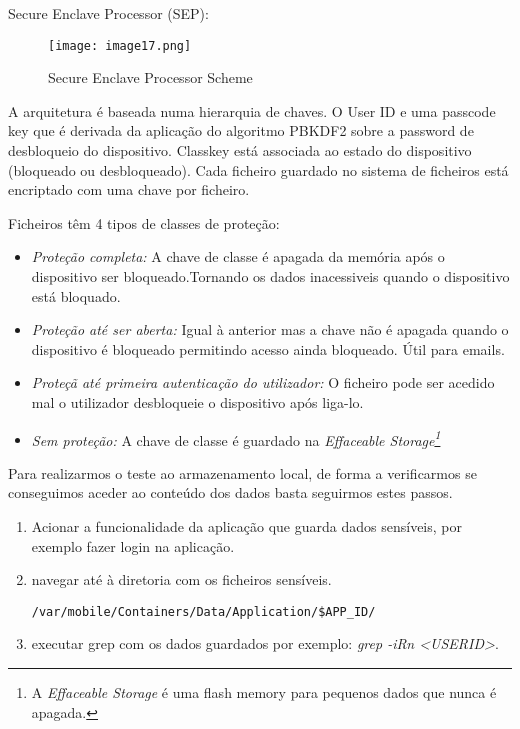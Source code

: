   Secure Enclave Processor (SEP):\par

\begin{figure}[H]
\centering
\texttt{[image: image17.png]}
\caption {Secure Enclave Processor Scheme}
\label {fig01}
\end{figure}

 		A arquitetura é baseada numa hierarquia de chaves.
 		O User ID e uma passcode key que é derivada da aplicação do algoritmo PBKDF2 sobre a password de desbloqueio do dispositivo. 
 		Classkey está associada ao estado do dispositivo (bloqueado ou desbloqueado).
 		Cada ficheiro guardado no sistema de ficheiros está encriptado com uma chave por ficheiro.\par


Ficheiros têm 4 tipos de classes de proteção:

\begin{itemize}
\item \textit{Proteção completa:}
		A chave de classe é apagada da memória após o dispositivo ser bloqueado.Tornando os dados inacessiveis quando o dispositivo está bloquado.\par
		\hfill\par

\item \textit{Proteção até ser aberta:}
		Igual à anterior mas a chave não é apagada quando o dispositivo é bloqueado permitindo acesso ainda bloqueado. Útil para emails.\par
		\hfill\par
\item \textit{Proteçã até primeira autenticação do utilizador:}
		O ficheiro pode ser acedido mal o utilizador desbloqueie o dispositivo após liga-lo.\par
		\hfill\par
\item \textit{Sem proteção:}
		A chave de classe é guardado na \textit{Effaceable Storage\footnote[0]{A \textit{Effaceable Storage} é uma flash memory para pequenos dados que nunca é apagada.}}\par
\end{itemize}


Para realizarmos o teste ao armazenamento local, de forma a verificarmos se conseguimos aceder ao conteúdo dos dados basta seguirmos estes passos.

\begin{enumerate}
\item Acionar a funcionalidade da aplicação que guarda dados sensíveis, por exemplo fazer login na aplicação.

\item navegar até à diretoria com os ficheiros sensíveis.
\begin{lstlisting}
/var/mobile/Containers/Data/Application/$APP_ID/
\end{lstlisting}
\item executar grep com os dados guardados por exemplo: \textit{grep -iRn <USERID>}.

\end{enumerate}

